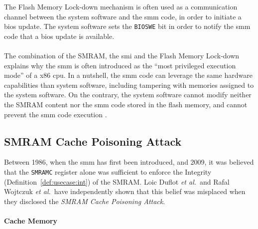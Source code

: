 The Flash Memory  Lock-down
mechanism is often used as a communication channel between the system software
and the \ac{smm} code, in order to initiate a \ac{bios} update.
%
The system software sets the \texttt{BIOSWE} bit in order to notify the \ac{smm}
code that a \ac{bios} update is available.

\paragraph{}
%
The combination of the SMRAM, the \ac{smi} and the Flash Memory Lock-down
explains why the \ac{smm} is often introduced as the ``most privileged execution
mode'' of a x86 \ac{cpu}.
%
In a nutshell, the \ac{smm} code can leverage the same hardware capabilities
than system software, including tampering with memories assigned to the system
software.
%
On the contrary, the system software cannot modify neither the SMRAM content nor
the \ac{smm} code stored in the flash memory, and cannot prevent the \ac{smm}
code execution .

\subsection{SMRAM Cache Poisoning Attack} %
\label{subsec:usecase:hse:smram}

Between 1986, when the \ac{smm} has first been introduced, and 2009, it was
believed that the \texttt{SMRAMC} register alone was sufficient to enforce the
Integrity (Definition~\ref{def:usecase:int}) of the SMRAM.
%
Loic Duflot \emph{et al.}\,\cite{duflot2009smram} and Rafal Wojtczuk \emph{et
  al.}\,\cite{wojtczuk2009smram} have independently shown that this belief was
misplaced when they disclosed the \emph{SMRAM Cache Poisoning Attack}.

\paragraph{Cache Memory}

